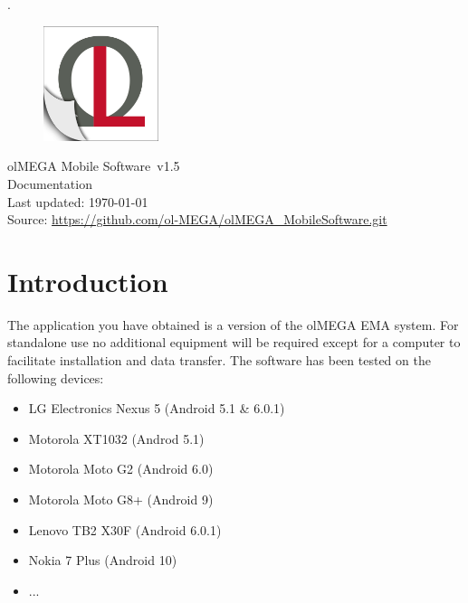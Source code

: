 \documentclass[11pt,a4paper,titlepage]{article}
\newcommand{\titleFull}{olMEGA Mobile Software}
\newcommand{\version}{v1.5}
\begin{document}
 
\pagestyle{empty}

\sffamily
\mdseries


\textcolor[rgb]{1,1,1}{.}
	\vspace{3cm}
	\begin{center}
	
	\begin{figure}[h]
		\centering
			\includegraphics[width=0.30\textwidth]{images/Logo_shadow.jpg}
	\end{figure}
	\vspace{3cm}
	\Huge
	\titleFull \ \version
	\normalsize
	\\
	\vspace{1cm}
	Documentation\\
	\vspace{1cm}
	Last updated: \today\\
	\vspace{1cm}
	Source: \url{https://github.com/ol-MEGA/olMEGA_MobileSoftware.git}
	\vfill
	\end{center}

%
\clearpage

\tableofcontents

\clearpage

\setcounter{page}{1}
\pagestyle{fancy}

\section{Introduction}

The application you have obtained is a version of the olMEGA EMA system. For standalone use no additional equipment will be required except for a computer to facilitate installation and data transfer. The software has been tested on the following devices:
\begin{itemize}
	\item LG Electronics Nexus 5 (Android 5.1 \& 6.0.1)
	\item Motorola XT1032 (Androd 5.1)
	\item Motorola Moto G2  (Android 6.0)
	\item Motorola Moto G8+ (Android 9)
	\item Lenovo TB2 X30F (Android 6.0.1)
	\item Nokia 7 Plus (Android 10)
	\item ...
\end{itemize}
\end{document}
